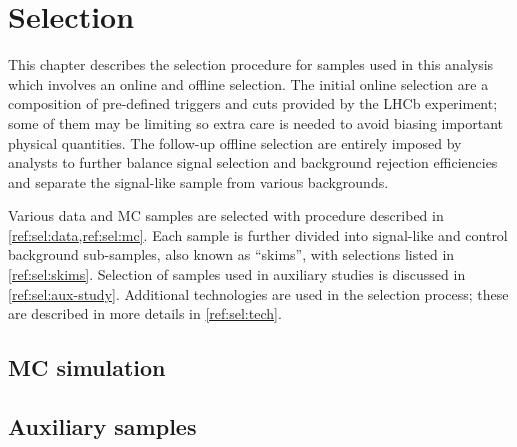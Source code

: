 \chapter{Selection}
\label{ref:sel}

This chapter describes the selection procedure for samples used in this
analysis which involves an online and offline selection.
The initial online selection are a composition of
pre-defined triggers and cuts provided by the LHCb experiment;
some of them may be limiting so extra care is needed to avoid biasing important
physical quantities.
The follow-up offline selection are entirely imposed by analysts
to further balance signal selection and background rejection efficiencies
and separate the signal-like sample from various backgrounds.

Various data and MC samples are selected with procedure described
in \cref{ref:sel:data,ref:sel:mc}.
Each sample is further divided into signal-like and control background
sub-samples, also known as ``skims'', with selections listed in
\cref{ref:sel:skims}.
Selection of samples used in auxiliary studies is discussed in
\cref{ref:sel:aux-study}.
Additional technologies are used in the selection process;
these are described in more details in
\cref{ref:sel:tech}.




\section{MC simulation}
\label{ref:sel:mc}



\section{Auxiliary samples}
\label{ref:sel:aux}


